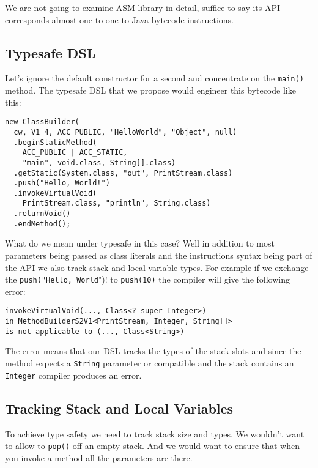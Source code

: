 \documentclass{sig-alternate}
\begin{document}
We are not going to examine ASM library in detail, suffice to say its API corresponds almost one-to-one to Java bytecode instructions.

\subsection{Typesafe DSL}

Let's ignore the default constructor for a second and concentrate on the \verb!main()! method. The typesafe DSL that we propose would engineer this bytecode like this:

\begin{verbatim}
new ClassBuilder(
  cw, V1_4, ACC_PUBLIC, "HelloWorld", "Object", null)    
  .beginStaticMethod(
    ACC_PUBLIC | ACC_STATIC, 
    "main", void.class, String[].class)
  .getStatic(System.class, "out", PrintStream.class)
  .push("Hello, World!")
  .invokeVirtualVoid(
    PrintStream.class, "println", String.class)
  .returnVoid()
  .endMethod();
\end{verbatim}

What do we mean under typesafe in this case? Well in addition to most parameters being passed as class literals and the instructions syntax being part of the API we also track stack and local variable types. For example if we exchange the \verb!push("Hello, World!")! to \verb!push(10)! the compiler will give the following error:

\begin{verbatim}
invokeVirtualVoid(..., Class<? super Integer>) 
in MethodBuilderS2V1<PrintStream, Integer, String[]>
is not applicable to (..., Class<String>)
\end{verbatim}

The error means that our DSL tracks the types of the stack slots and since the method expects a \verb!String! parameter or compatible and the stack contains an \verb!Integer! compiler produces an error. 

\subsection{Tracking Stack and Local Variables}

To achieve type safety we need to track stack size and types. We wouldn't want to allow to \verb!pop()! off an empty stack. And we would want to ensure that when you invoke a method all the parameters are there. 
\end{document}
